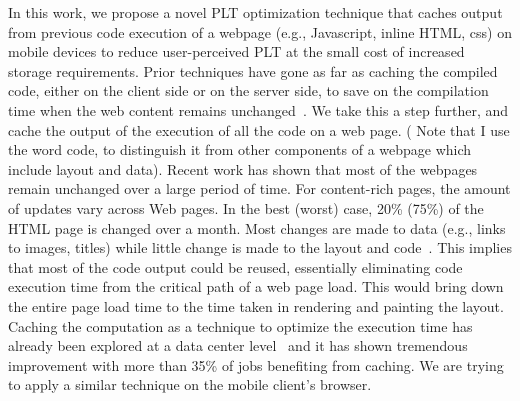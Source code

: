 In this work, we propose a novel PLT optimization technique that caches output
from previous code execution of a webpage (e.g., Javascript, inline
HTML, css) on mobile devices to reduce user-perceived PLT at the small cost
of increased storage requirements.
Prior techniques have gone as far as caching the compiled code, either
on the client side or on the server side, to save on the compilation
time when the web content remains unchanged~\cite{wang2014much}. We
take this a step further, and cache the output of the execution of all
the code on a web page. ( Note that I use the word code, to
distinguish it from other components of a webpage which include layout
and data). Recent work has shown that most of the webpages remain
unchanged over a large period of time. For content-rich pages, the
amount of updates vary across Web pages. In the best (worst) case,
20\% (75\%) of the HTML page is changed over a month. Most changes are
made to data (e.g., links to images, titles) while little change is made to
the layout and code~\cite{wang2014much}.  This implies that most of the
code output could be reused, essentially eliminating code execution
time from the critical path of a web page load. This would bring down
the entire page load time to the time taken in rendering and painting the
layout. 
Caching the computation as a technique to optimize the execution time has
already been explored at a data center level~\cite{gunda2010nectar} and it has
shown tremendous improvement with more than 35\% of jobs benefiting from caching.
We are trying to apply a similar technique on the mobile client's browser.